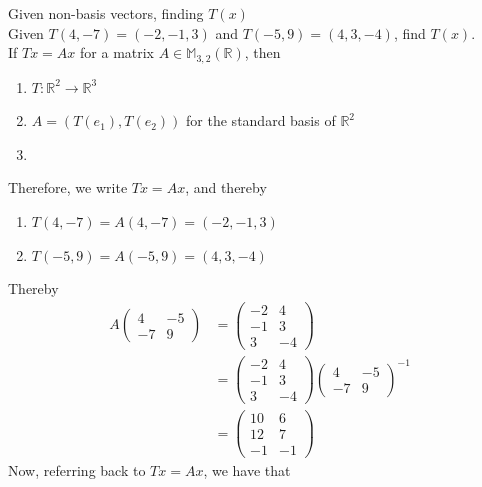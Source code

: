 \documentclass[journal, letterpaper]{IEEEtran}
\begin{document}
    \begin{myboxg}{Given non-basis vectors, finding $T(x)$} \\ 
        Given $T(4, -7) = (-2, -1, 3)$ and $T(-5, 9) = (4, 3, -4)$, find $T(x)$.
        \newline \\ 
        If $Tx = Ax$ for a matrix $A \in \mathbb{M}_{3, 2}(\mathbb{R})$, then
        \begin{enumerate}
            \item $T : \mathbb{R}^2 \to \mathbb{R}^3$
            \item $A = (T(e_1), T(e_2))$ for the standard basis of $\mathbb{R}^2$
            \item 
        \end{enumerate}
        Therefore, we write $Tx = Ax$, and thereby 
        \begin{enumerate}
            \item $T(4, -7) = A(4, -7) = (-2, -1, 3)$
            \item $T(-5, 9) = A(-5, 9) = (4, 3, -4)$
        \end{enumerate}
        Thereby
        \begin{align*}
            A\begin{pmatrix}
                4 & -5 \\ -7 & 9
            \end{pmatrix} &= 
            \begin{pmatrix}
                -2 & 4 \\ -1 & 3 \\ 3 & -4
            \end{pmatrix} \\ 
            &= \begin{pmatrix}
                -2 & 4 \\ -1 & 3 \\ 3 & -4
            \end{pmatrix}\begin{pmatrix}
                4 & -5 \\ -7 & 9
            \end{pmatrix}^{-1} \\
            &= \begin{pmatrix}
                10 & 6 \\ 12 & 7 \\ -1 & -1
            \end{pmatrix}
        \end{align*}
        Now, referring back to $Tx = Ax$, we have that

\end{myboxg}
\end{document}
